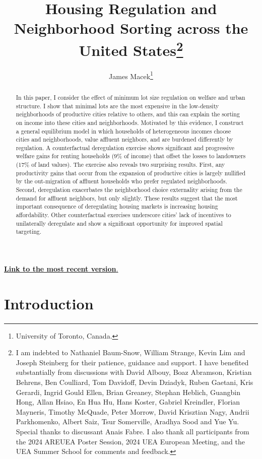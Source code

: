 \documentclass[12pt]{article}
\title{Housing Regulation and Neighborhood Sorting across the United States\footnote{\scriptsize I am indebted to Nathaniel Baum-Snow, William Strange, Kevin Lim and Joseph Steinberg for their patience, guidance and support. I have benefited substantially from discussions with David Albouy, Boaz Abramson, Kristian Behrens, Ben Coulliard, Tom Davidoff, Devin Dziadyk, Ruben Gaetani, Kris Gerardi, Ingrid Gould Ellen, Brian Greaney, Stephan Heblich, Guangbin Hong, Allan Hsiao, En Hua Hu, Hans Koster, Gabriel Kreindler, Florian Mayneris, Timothy McQuade, Peter Morrow, David Krisztian Nagy, Andrii Parkhomenko, Albert Saiz, Tsur Somerville, Aradhya Sood and Yue Yu. Special thanks to discussant Anais Fabre. I also thank all participants from the 2024 AREUEA Poster Session, 2024 UEA European Meeting, and the UEA Summer School for comments and feedback.}}
\author{James Macek\footnote{\scriptsize University of Toronto, Canada.}}
\begin{document}
\maketitle	

\begin{center}
\href{http://jamesmacek.github.io/files/JamesMacek_JMP_HousingRegNhoodSortUS.pdf}{\textbf{Link to the most recent version}.}
\end{center}
	
\begin{abstract}
	\footnotesize
In this paper, I consider the effect of minimum lot size regulation on welfare and urban structure. I show that minimal lots are the most expensive in the low-density neighborhoods of productive cities relative to others, and this can explain the sorting on income into these cities and neighborhoods. Motivated by this evidence, I construct a general equilibrium model in which households of heterogeneous incomes choose cities and neighborhoods, value affluent neighbors, and are burdened differently by regulation. A counterfactual deregulation exercise shows significant and progressive welfare gains for renting households ($9 \%$ of income) that offset the losses to landowners ($17\%$ of land values). The exercise also reveals two surprising results. First, any productivity gains that occur from the expansion of productive cities is largely nullified by the out-migration of affluent households who prefer regulated neighborhoods. Second, deregulation exacerbates the neighborhood choice externality arising from the demand for affluent neighbors, but only slightly. These results suggest that the most important consequence of deregulating housing markets is increasing housing affordability. Other counterfactual exercises underscore cities' lack of incentives to unilaterally deregulate and show a significant opportunity for improved spatial targeting.


\end{abstract}	




	\newpage	
	\section{Introduction}
		
	\paragraph*{}
	
\end{document}
